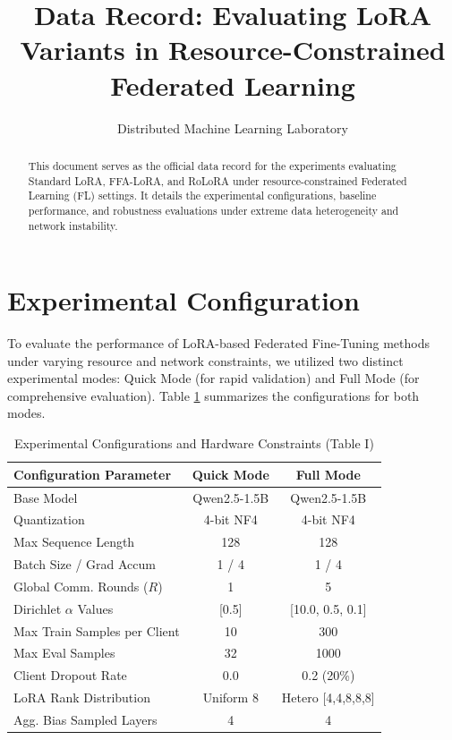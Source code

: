 \documentclass[journal]{IEEEtran}
\begin{document}
\title{Data Record: Evaluating LoRA Variants in Resource-Constrained Federated Learning}
\author{Distributed Machine Learning Laboratory}

\maketitle

\begin{abstract}
This document serves as the official data record for the experiments evaluating Standard LoRA, FFA-LoRA, and RoLoRA under resource-constrained Federated Learning (FL) settings. It details the experimental configurations, baseline performance, and robustness evaluations under extreme data heterogeneity and network instability.
\end{abstract}

\section{Experimental Configuration}
To evaluate the performance of LoRA-based Federated Fine-Tuning methods under varying resource and network constraints, we utilized two distinct experimental modes: Quick Mode (for rapid validation) and Full Mode (for comprehensive evaluation). Table \ref{tab:config} summarizes the configurations for both modes.

\begin{table}[h!]
\centering
\caption{Experimental Configurations and Hardware Constraints (Table I)}
\label{tab:config}
\begin{tabular}{p{4cm} c c}
\toprule
\textbf{Configuration Parameter} & \textbf{Quick Mode} & \textbf{Full Mode} \\
\midrule
Base Model & Qwen2.5-1.5B & Qwen2.5-1.5B \\
Quantization & 4-bit NF4 & 4-bit NF4 \\
Max Sequence Length & 128 & 128 \\
Batch Size / Grad Accum & 1 / 4 & 1 / 4 \\
Global Comm. Rounds ($R$) & 1 & 5 \\
Dirichlet $\alpha$ Values & [0.5] & [10.0, 0.5, 0.1] \\
Max Train Samples per Client & 10 & 300 \\
Max Eval Samples & 32 & 1000 \\
Client Dropout Rate & 0.0 & 0.2 (20\%) \\
LoRA Rank Distribution & Uniform 8 & Hetero [4,4,8,8,8] \\
Agg. Bias Sampled Layers & 4 & 4 \\
\bottomrule
\end{tabular}
\end{table}
\end{document}
